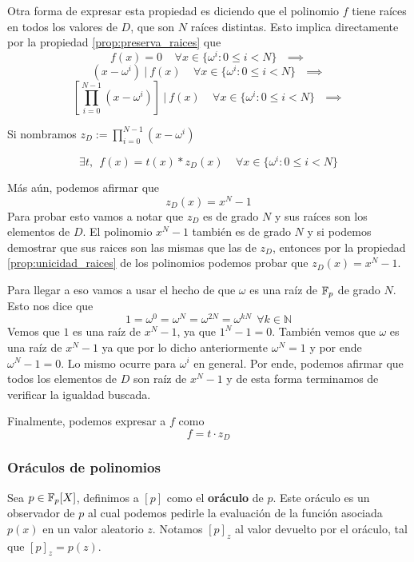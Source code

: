 Otra forma de expresar esta propiedad es diciendo que el polinomio $f$ tiene raíces en todos los valores de $D$, que son $N$ raíces distintas. Esto implica directamente por la propiedad \ref{prop:preserva_raices} que 
$$f(x) = 0 ~~~~~ \forall x \in \{\omega^i : 0 \leq i < N\} ~~~ \implies$$
$$(x - \omega^i)~|~ f(x) ~~~~~ \forall x \in \{\omega^i : 0 \leq i < N\} ~~~ \implies$$
$$\left[\prod_{i=0}^{N-1} (x - \omega^i)\right]~|~ f(x) ~~~~~ \forall x \in \{\omega^i : 0 \leq i < N\} ~~~ \implies$$
\begin{center}
Si nombramos $z_D := \prod_{i=0}^{N-1} (x - \omega^i)$
\end{center}

$$\exists t, ~~ f(x) = t(x) * z_D(x) ~~~~~ \forall x \in \{\omega^i : 0 \leq i < N\}$$

Más aún, podemos afirmar que 
$$z_D(x) = x^N-1$$
Para probar esto vamos a notar que $z_D$ es de grado $N$ y sus raíces son los elementos de $D$. El polinomio $x^N-1$ también es de grado $N$ y si podemos demostrar que sus raices son las mismas que las de $z_D$, entonces por la propiedad \ref{prop:unicidad_raices} de los polinomios podemos probar que $z_D(x) = x^N-1$. 

Para llegar a eso vamos a usar el hecho de que $\omega$ es una raíz de $\mathbb{F}_p$ de grado $N$. Esto nos dice que 
$$1=\omega^0=\omega^N=\omega^{2N}=\omega^{kN} ~~ \forall k\in \mathbb{N}$$
Vemos que $1$ es una raíz de $x^N-1$, ya que $1^N-1 = 0$. También vemos que $\omega$ es una raíz de $x^N-1$ ya que por lo dicho anteriormente $\omega^N = 1$ y por ende $\omega^N - 1 = 0$. Lo mismo ocurre para $\omega^i$ en general. Por ende, podemos afirmar que todos los elementos de $D$ son raíz de $x^N-1$ y de esta forma terminamos de verificar la igualdad buscada.

Finalmente, podemos expresar a $f$ como
$$f = t \cdot z_D$$

\vspace{1em}

\subsubsection{\textbf{Oráculos de polinomios}} \label{sec:oraculos}

Sea $p \in \mathbb{F}_p[X]$, definimos a $[p]$ como el \textbf{oráculo} de $p$. Este oráculo es un observador de $p$ al cual podemos pedirle la evaluación de la función asociada $p(x)$ en un valor aleatorio $z$. Notamos $[p]_z$ al valor devuelto por el oráculo, tal que $[p]_z = p(z)$. 

